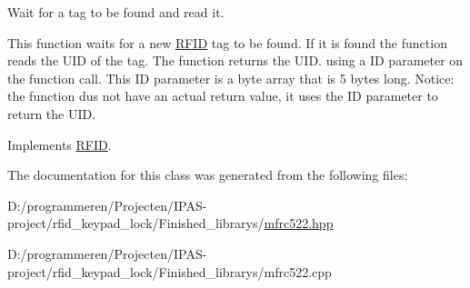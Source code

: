 Wait for a tag to be found and read it. 

This function waits for a new \hyperlink{class_r_f_i_d}{R\+F\+ID} tag to be found. If it is found the function reads the U\+ID of the tag. The function returns the U\+ID. using a ID parameter on the function call. This ID parameter is a byte array that is 5 bytes long. Notice\+: the function dus not have an actual return value, it uses the ID parameter to return the U\+ID. 

Implements \hyperlink{class_r_f_i_d_a7e02863bc0f1f117b05d72f9063497f7}{R\+F\+ID}.



The documentation for this class was generated from the following files\+:\begin{DoxyCompactItemize}
\item 
D\+:/programmeren/\+Projecten/\+I\+P\+A\+S-\/project/rfid\+\_\+keypad\+\_\+lock/\+Finished\+\_\+librarys/\hyperlink{mfrc522_8hpp}{mfrc522.\+hpp}\item 
D\+:/programmeren/\+Projecten/\+I\+P\+A\+S-\/project/rfid\+\_\+keypad\+\_\+lock/\+Finished\+\_\+librarys/mfrc522.\+cpp\end{DoxyCompactItemize}
